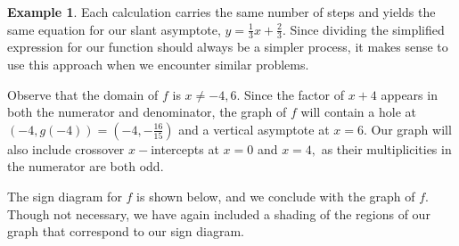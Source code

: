 \documentclass[12pt]{book}
\theoremstyle{definition}
\newtheorem{example}{Example}
\begin{document}
\begin{example}
Each calculation carries the same number of steps and yields the same equation for our slant asymptote, $y=\frac{1}{3}x+\frac{2}{3}$.  Since dividing the simplified expression for our function should always be a simpler process, it makes sense to use this approach when we encounter similar problems.
\par
Observe that the domain of $f$ is $x\neq -4,6$.  Since the factor of $x+4$ appears in both the numerator and denominator, the graph of $f$ will contain a hole at $(-4,g(-4))=(-4,-\frac{16}{15})$ and a vertical asymptote at $x=6$.  Our graph will also include crossover $x-$intercepts at $x=0$ and $x=4,$ as their multiplicities in the numerator are both odd.
\par
The sign diagram for $f$ is shown below, and we conclude with the graph of $f$.  Though not necessary, we have again included a shading of the regions of our graph that correspond to our sign diagram.
\begin{center}


\end{center}
\end{example}
\end{document}
